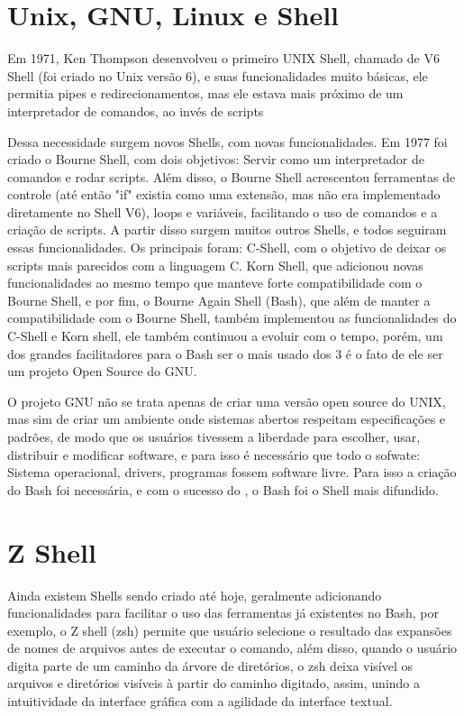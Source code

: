 \documentclass[oneside, 11 pt]{article}
\begin{document}
	\section{Unix, GNU, Linux e Shell}
	Em 1971, Ken Thompson desenvolveu o primeiro UNIX Shell, chamado de V6 Shell (foi criado no Unix versão 6), e suas funcionalidades muito básicas, ele permitia pipes e redirecionamentos, mas ele estava mais próximo de um interpretador de comandos, ao invés de scripts\par
	Dessa necessidade surgem novos Shells, com novas funcionalidades. Em 1977 foi criado o Bourne Shell, com dois objetivos: Servir como um interpretador de comandos e rodar scripts. Além disso, o Bourne Shell acrescentou ferramentas de controle (até então "if" existia como uma extensão, mas não era implementado diretamente no Shell V6), loops e variáveis, facilitando o uso de comandos e a criação de scripts. A partir disso surgem muitos outros Shells, e todos seguiram essas funcionalidades. Os principais foram: C-Shell, com o objetivo de deixar os scripts mais parecidos com a linguagem C. Korn Shell, que adicionou novas funcionalidades ao mesmo tempo que manteve forte compatibilidade com o Bourne Shell, e por fim, o Bourne Again Shell (Bash), que além de manter a compatibilidade com o Bourne Shell, também implementou as funcionalidades do C-Shell e Korn shell, ele também continuou a evoluir com o tempo, porém, um dos grandes facilitadores para o Bash ser o mais usado dos 3 é o fato de ele ser um projeto Open Source do GNU. \par
	O projeto GNU não se trata apenas de criar uma versão open source do UNIX, mas sim de criar um ambiente onde sistemas abertos respeitam especificações e padrões, de modo que os usuários tivessem a liberdade para escolher, usar, distribuir e modificar software, e para isso é necessário que todo o sofwate: Sistema operacional, drivers, programas fossem software livre. Para isso a criação do Bash foi necessária, e com o sucesso do \cite{gnu}, o Bash foi o Shell mais difundido.
	\section{Z Shell}
	Ainda existem Shells sendo criado até hoje, geralmente adicionando funcionalidades para
	facilitar o uso das ferramentas já existentes no Bash, por exemplo, o Z shell (zsh) permite
	que usuário selecione o resultado das expansões de nomes de arquivos antes de executar o
	comando, além disso, quando o usuário digita parte de um caminho da árvore de diretórios,
	o zsh deixa visível os arquivos e diretórios visíveis à partir do caminho digitado, assim,
	unindo a intuitividade da interface gráfica com a agilidade da interface textual.
\end{document}

